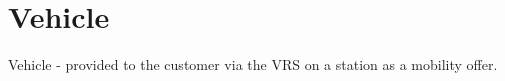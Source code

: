 %
%
%
\section*{Vehicle}

Vehicle - provided to the customer via the VRS on a station as a mobility offer.

